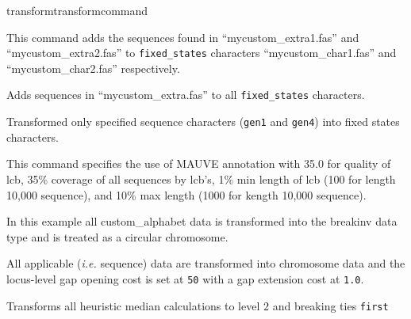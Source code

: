 \begin{command}{transform}{transformcommand}
\begin{poyexamples}
		{This command adds the sequences found in ``mycustom\_extra1.fas'' and ``mycustom\_extra2.fas'' 
		to \texttt{fixed\_states} characters 
		``mycustom\_char1.fas'' and ``mycustom\_char2.fas'' respectively.}
		
		{Adds sequences in ``mycustom\_extra.fas'' to all \texttt{fixed\_states} 
		characters.}
		
           	{Transformed only specified sequence characters (\texttt{gen1} and
           	\texttt{gen4}) into fixed states characters.}
           	
		{This command specifies the use of MAUVE annotation with 35.0 for quality of lcb,
		35\% coverage of all sequences by lcb's, 1\% min length of lcb (100 for length 10,000 
		sequence), and 10\% max length (1000 for kength 10,000 sequence).}
		
           	{In this example all custom\_alphabet data is transformed into the breakinv data type 
		and is treated as a circular chromosome.}
          
          {All applicable (\emph{i.e.} sequence) data are transformed into chromosome data 
		and the locus-level gap opening cost is set at \texttt{50} with a gap extension cost at \texttt{1.0}.}
              	
		 {Transforms all heuristic median calculations to level $2$ and breaking ties
		 \texttt{first}}
		 
            
	\end{poyexamples}	    

\end{command}


